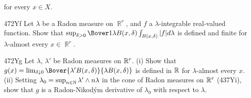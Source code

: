 {

\noindent for every $x\in X$.

\spheader 472Yf Let $\lambda$ be a Radon measure on $\BbbR^r$, and $f$ a
$\lambda$-integrable real-valued function.   Show that
$\sup_{\delta>0}\Bover1{\lambda B(x,\delta)}
  \int_{B(x,\delta)}|f|d\lambda$  is defined and finite for
$\lambda$-almost every $x\in\BbbR^r$.

\spheader 472Yg Let $\lambda$, $\lambda'$ be Radon measures on
$\Bbb R^r$.   (i) Show that $g(x)=\lim_{\delta\downarrow 0}
\Bover{\lambda'B(x,\delta)}{\lambda B(x,\delta)}$ is defined in
$\Bbb R$ for $\lambda$-almost every $x$.   (ii) Setting
$\lambda_0=\sup_{n\in\Bbb N}\lambda'\wedge n\lambda$ in the cone of Radon
measures on $\Bbb R^r$ (437Yi),
show that $g$ is a Radon-Nikod\'ym derivative of $\lambda_0$ with respect
to $\lambda$.
}%

